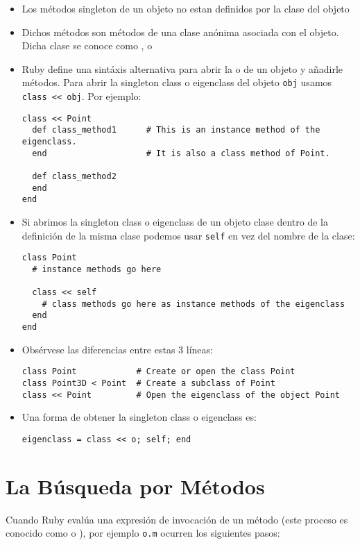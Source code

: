 \begin{itemize}
\item
Los métodos singleton de un objeto no estan definidos por la clase del objeto
\item
Dichos métodos son métodos de una clase anónima asociada con el objeto.
Dicha clase se conoce como ,  o 
\item
Ruby define una sintáxis alternativa para abrir la  o de un objeto y añadirle
métodos. Para abrir la singleton class o eigenclass del objeto \verb|obj| usamos \verb|class << obj|. Por
ejemplo:
\begin{verbatim}
class << Point
  def class_method1      # This is an instance method of the eigenclass.
  end                    # It is also a class method of Point.

  def class_method2
  end
end
\end{verbatim}
\item Si abrimos la singleton class o 
eigenclass de un objeto clase dentro de la definición de la misma clase
podemos usar \verb|self| en vez del nombre de la clase:
\begin{verbatim}
class Point
  # instance methods go here

  class << self
    # class methods go here as instance methods of the eigenclass
  end
end
\end{verbatim}
\item
Obsérvese las diferencias entre estas 3 líneas:
\begin{verbatim}
class Point            # Create or open the class Point
class Point3D < Point  # Create a subclass of Point
class << Point         # Open the eigenclass of the object Point
\end{verbatim}

\item
Una forma de obtener la singleton class o eigenclass es:
\begin{verbatim}
eigenclass = class << o; self; end
\end{verbatim}
\end{itemize}

\section{La Búsqueda por Métodos}
\label{section:la_busqueda_por_metodos}

Cuando Ruby evalúa una expresión de invocación de un método (este proceso
es conocido como  o ), por ejemplo
\verb|o.m| ocurren los siguientes pasos:

